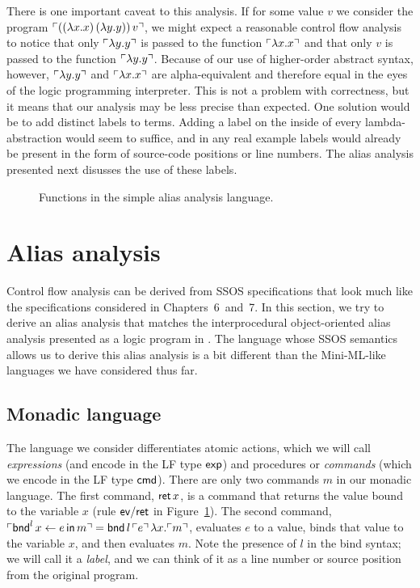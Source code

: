 There is one important caveat to this analysis. If for some value $v$
we consider the program ${\ulcorner{((\lambda x.x)\,(\lambda y.y))\,v}\urcorner}$,
we might expect a reasonable control flow analysis to notice that only
${\ulcorner{\lambda y.y}\urcorner}$ is passed to the function ${\ulcorner{\lambda
  x.x}\urcorner}$ and that only $v$ is passed to the function ${\ulcorner{\lambda
  y.y}\urcorner}$. Because of our use of higher-order abstract syntax, however,
${\ulcorner{\lambda y.y}\urcorner}$ and ${\ulcorner{\lambda x.x}\urcorner}$ are alpha-equivalent
and therefore equal in the eyes of the logic programming
interpreter. This is not a problem with correctness, but it means that
our analysis may be less precise than expected. One solution would be
to add distinct labels to terms. Adding a label on the inside of every
lambda-abstraction would seem to suffice, and in any real example
labels would already be present in the form of source-code positions
or line numbers. The alias analysis presented next disusses the use of
these labels.

\begin{figure}
\caption{Functions in the simple alias analysis language.}
\label{fig:ssos-monadic}
\end{figure}

\section{Alias analysis}

Control flow analysis can be derived from SSOS specifications that
look much like the specifications considered in Chapters~6~and~7.  In
this section, we try to derive an alias analysis that matches the
interprocedural object-oriented alias analysis presented as a logic
program in \cite[Chapter 12.4]{aho07compilers}. The language whose
SSOS semantics allows us to derive this alias analysis is a bit
different than the Mini-ML-like languages we have considered thus far.

\subsection{Monadic language}

The language we consider differentiates atomic actions, which we will
call {\it expressions} (and encode in the LF type ${\sf exp}$) and
procedures or {\it commands} (which we encode in the LF type ${\sf
  cmd}$). There are only two commands $m$ in our monadic language. The
first command, ${\sf ret}\,x$, is a command that returns the value
bound to the variable $x$ (rule ${\sf ev/ret}$ in
Figure~\ref{fig:ssos-monadic}). The second command, ${\ulcorner{{\sf
    bnd}^l\, x \leftarrow e \,{\sf in}\,m}\urcorner} = {\sf
  bnd}\,l\,{\ulcorner{e}\urcorner}\,\lambda x.{\ulcorner{m}\urcorner}$, evaluates $e$ to a
value, binds that value to the variable $x$, and then evaluates
$m$. Note the presence of $l$ in the bind syntax; we will call it a
{\it label}, and we can think of it as a line number or source
position from the original program.

